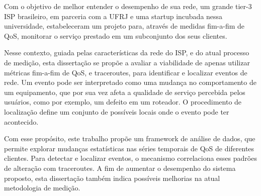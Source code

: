 Com o objetivo de melhor entender o desempenho de sua rede,
um grande tier-3 ISP brasileiro, em parceria com a UFRJ e uma startup incubada
nessa universidade,
estabeleceram um projeto para, atrav\'es de medidas fim-a-fim de QoS,
monitorar o servi\c{c}o prestado em um subconjunto dos seus clientes.

Nesse contexto, guiada pelas caracter\'isticas da rede do ISP, e do atual
processo de medi\c{c}\~ao, esta disserta\c{c}\~ao se prop\~oe a
avaliar a viabilidade de apenas utilizar m\'etricas fim-a-fim de QoS, e
traceroutes, para identificar e localizar eventos de rede. Um evento pode ser
interpretado como uma mudan\c{c}a no comportamento de um equipamento, que por
sua vez afeta a qualidade de servi\c{c}o percebida pelos usu\'arios,
como por exemplo, um defeito em um roteador.
O procedimento de localiza\c{c}\~ao define um conjunto de poss\'iveis
locais onde o evento pode ter acontecido.

Com esse prop\'osito, este trabalho prop\~oe um framework de an\'alise de dados,
que permite explorar mudan\c{c}as estat\'isticas nas s\'eries temporais de QoS
de diferentes clientes. Para detectar e localizar eventos, o mecanismo
correlaciona esses padr\~oes de altera\c{c}\~ao com traceroutes.
A fim de aumentar o
desempenho do sistema proposto, esta disserta\c{c}\~ao tamb\'em indica
poss\'iveis melhorias na atual metodologia de medi\c{c}\~ao.

